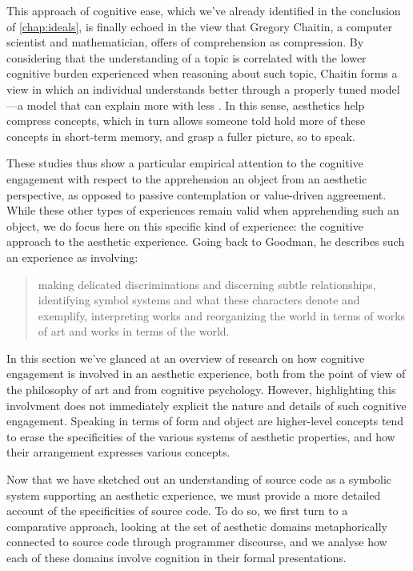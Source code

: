 This approach of cognitive ease, which we've already identified in the conclusion of \ref{chap:ideals}, is finally echoed in the view that Gregory Chaitin, a computer scientist and mathematician, offers of comprehension as compression. By considering that the understanding of a topic is correlated with the lower cognitive burden experienced when reasoning about such topic, Chaitin forms a view in which an individual understands better through a properly tuned model—a model that can explain more with less \citep{zenil_compression_2021}. In this sense, aesthetics help compress concepts, which in turn allows someone told hold more of these concepts in short-term memory, and grasp a fuller picture, so to speak.

These studies thus show a particular empirical attention to the cognitive engagement with respect to the apprehension an object from an aesthetic perspective, as opposed to passive contemplation or value-driven aggreement. While these other types of experiences remain valid when apprehending such an object, we do focus here on this specific kind of experience: the cognitive approach to the aesthetic experience. Going back to Goodman, he describes such an experience as involving:

\begin{quote}
    making delicated discriminations and discerning subtle relationships, identifying symbol systems and what these characters denote and exemplify, interpreting works and reorganizing the world in terms of works of art and works in terms of the world. \citep{goodman_languages_1976}
\end{quote}

\spacersmall

In this section we've glanced at an overview of research on how cognitive engagement is involved in an aesthetic experience, both from the point of view of the philosophy of art and from cognitive psychology. However, highlighting this involvment does not immediately explicit the nature and details of such cognitive engagement. Speaking in terms of form and object are higher-level concepts tend to erase the specificities of the various systems of aesthetic properties, and how their arrangement expresses various concepts.

Now that we have sketched out an understanding of source code as a symbolic system supporting an aesthetic experience, we must provide a more detailed account of the specificities of source code. To do so, we first turn to a comparative approach, looking at the set of aesthetic domains metaphorically connected to source code through programmer discourse, and we analyse how each of these domains involve cognition in their formal presentations.


